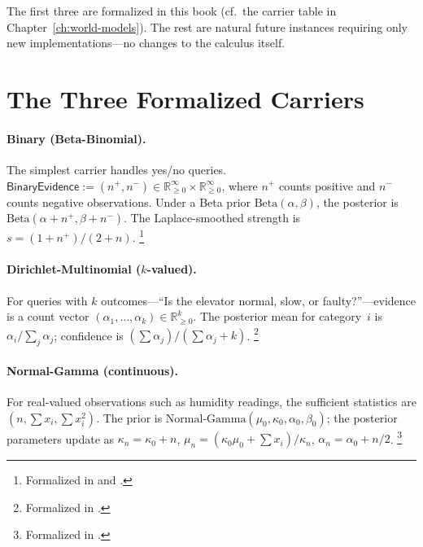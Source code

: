 \documentclass[11pt,openany]{report}
\begin{document}
\noindent
The first three are formalized in this book
(cf.\ the carrier table in Chapter~\ref{ch:world-models}).  The rest
are natural future instances requiring only new 
implementations---no changes to the calculus itself.


\section{The Three Formalized Carriers}

\paragraph{Binary (Beta-Binomial).}
The simplest carrier handles yes/no queries.
$\mathsf{BinaryEvidence} := (n^+, n^-) \in
\mathbb{R}_{\ge 0}^\infty \times \mathbb{R}_{\ge 0}^\infty$,
where $n^+$ counts positive and $n^-$ counts negative observations.
Under a Beta prior $\text{Beta}(\alpha, \beta)$, the posterior is
$\text{Beta}(\alpha + n^+, \beta + n^-)$.  The Laplace-smoothed
strength is $s = (1 + n^+) / (2 + n)$.%
\footnote{Formalized in 
and .}

\paragraph{Dirichlet-Multinomial ($k$-valued).}
For queries with $k$ outcomes---``Is the elevator normal, slow, or
faulty?''---evidence is a count vector
$(\alpha_1, \ldots, \alpha_k) \in \mathbb{R}_{\ge 0}^k$.
The posterior mean for category~$i$ is
$\alpha_i / \sum_j \alpha_j$; confidence is
$(\sum \alpha_j) / (\sum \alpha_j + k)$.%
\footnote{Formalized in .}

\paragraph{Normal-Gamma (continuous).}
For real-valued observations such as humidity readings, the sufficient
statistics are $(n, \sum x_i, \sum x_i^2)$.  The prior is
$\text{Normal-Gamma}(\mu_0, \kappa_0, \alpha_0, \beta_0)$; the
posterior parameters update as
$\kappa_n = \kappa_0 + n$,
$\mu_n = (\kappa_0 \mu_0 + \sum x_i) / \kappa_n$,
$\alpha_n = \alpha_0 + n/2$.%
\footnote{Formalized in .}
\end{document}
